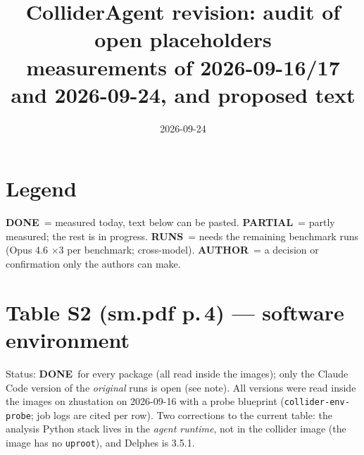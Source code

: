 \documentclass[11pt]{article}
\title{ColliderAgent revision: audit of open placeholders\\ \large measurements of 2026-09-16/17 and 2026-09-24, and proposed text}
\date{2026-09-24}
\newcommand{\statusdone}{\textcolor{green!50!black}{\textbf{DONE}}}
\newcommand{\statuspartial}{\textcolor{orange!80!black}{\textbf{PARTIAL}}}
\newcommand{\statusneedrun}{\textcolor{blue!70!black}{\textbf{RUNS}}}
\newcommand{\statusauthor}{\textcolor{red!70!black}{\textbf{AUTHOR}}}
\begin{document}
\maketitle

\section*{Legend}
\statusdone\ = measured today, text below can be pasted. \statuspartial\ = partly measured; the rest is in progress.
\statusneedrun\ = needs the remaining benchmark runs (Opus 4.6 $\times$3 per benchmark; cross-model). \statusauthor\ = a decision or confirmation only the authors can make.

\section{Table S2 (sm.pdf p.\,4) --- software environment}
Status: \statusdone\ for every package (all read inside the images); only the Claude Code version of the \emph{original} runs is open (see note).
All versions were read inside the images on zhustation on 2026-09-16 with a probe blueprint
(\texttt{collider-env-probe}; job logs are cited per row). Two corrections to the current table: the analysis Python
stack lives in the \emph{agent runtime}, not in the collider image (the image has no \texttt{uproot}), and Delphes is 3.5.1.
\end{document}
